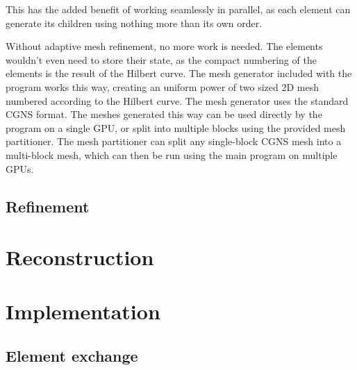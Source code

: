 
This has the added benefit of working seamlessly in parallel, as each element can generate its
children using nothing more than its own order.

Without adaptive mesh refinement, no more work is needed. The elements wouldn't even need to store
their state, as the compact numbering of the elements is the result of the Hilbert curve. The mesh
generator included with the program works this way, creating an uniform power of two sized 2D mesh
numbered according to the Hilbert curve. The mesh generator uses the standard CGNS format. The
meshes generated this way can be used directly by the program on a single GPU, or split into
multiple blocks using the provided mesh partitioner. The mesh partitioner can split any single-block
CGNS mesh into a multi-block mesh, which can then be run using the main program on multiple GPUs.

\subsection{Refinement} \label{section:load_balancing:hilbert_curve:refinement}


\section{Reconstruction} \label{section:load_balancing:reconstruction}

\section{Implementation} \label{section:load_balancing:implementation}
\subsection{Element exchange} \label{section:load_balancing:implementation:element_exchange}
